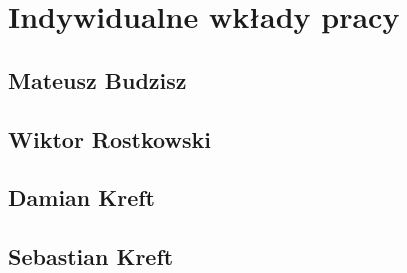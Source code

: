 

\section{Indywidualne wkłady pracy}
\label{sec:indywidualne-wklady-pracy}


\subsection{Mateusz Budzisz}
\label{sec:mateusz-budzisz}

\subsection{Wiktor Rostkowski}
\label{sec:wiktor-rostkowski}

\subsection{Damian Kreft}
\label{sec:damian-kreft}

\subsection{Sebastian Kreft}
\label{sec:sebastian-kreft}




